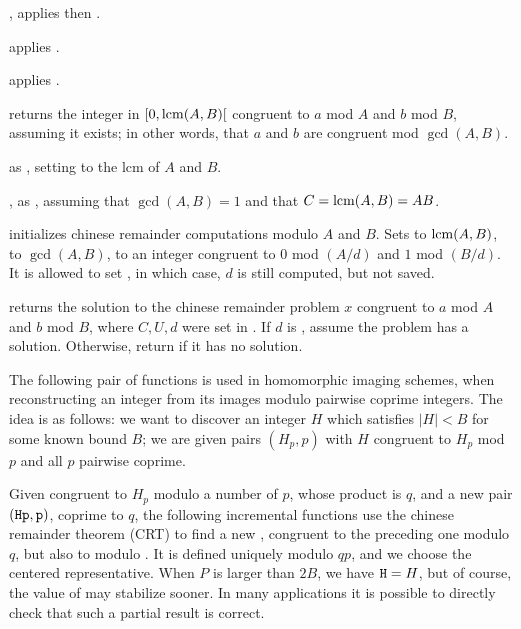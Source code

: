 , applies  then
.

 applies .

 applies .


 returns the integer
in $[0, {\rm lcm}(A,B)[$ congruent to $a$ mod $A$ and $b$ mod $B$, assuming it
exists; in other words, that $a$ and $b$ are congruent mod $\gcd(A,B)$.

 as
, setting  to the lcm of $A$ and $B$.

, as
, assuming that $\gcd(A,B) = 1$ and that $C = {\rm lcm}(A,B) = AB$.

initializes chinese remainder computations modulo $A$ and $B$. Sets
 to ${\rm lcm}(A,B)$,  to $\gcd(A,B)$,
 to an integer congruent to $0$ mod $(A/d)$ and $1$ mod $(B/d)$.
It is allowed to set , in which case, $d$ is still
computed, but not saved.

 returns
the solution to the chinese remainder problem $x$ congruent
to $a$ mod $A$ and $b$ mod $B$, where $C, U, d$ were set in
. If $d$ is , assume the problem has a
solution. Otherwise, return  if it has no solution.

\medskip

The following pair of functions is used in homomorphic imaging schemes,
when reconstructing an integer from its images modulo pairwise coprime
integers. The idea is as follows: we want to discover an integer $H$ which
satisfies $|H| < B$ for some known bound $B$; we are given pairs $(H_p, p)$
with $H$ congruent to $H_p$ mod $p$ and all $p$ pairwise coprime.

Given  congruent to $H_p$ modulo a number of $p$, whose product is
$q$, and a new pair $({\tt Hp}, {\tt p})$,  coprime to $q$, the
following incremental functions use the chinese remainder theorem (CRT) to
find a new , congruent to the preceding one modulo $q$, but also to
 modulo . It is defined uniquely modulo $qp$, and we choose
the centered representative. When $P$ is larger than $2B$, we have ${\tt H} =
H$, but of course, the value of  may stabilize sooner. In many
applications it is possible to directly check that such a partial result is
correct.

